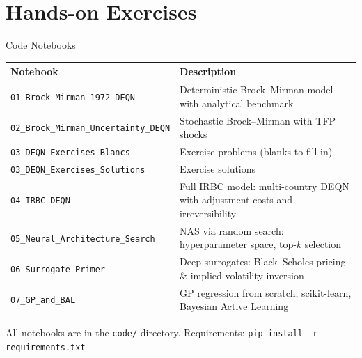 \documentclass[aspectratio=169,11pt]{beamer}
\begin{document}

\section{Hands-on Exercises}

\begin{frame}{Code Notebooks}
\begin{center}
\renewcommand{\arraystretch}{1.4}
{\small
\begin{tabular}{@{}lp{8cm}@{}}
\toprule
\textbf{Notebook} & \textbf{Description} \\
\midrule
\texttt{01\_Brock\_Mirman\_1972\_DEQN} & Deterministic Brock--Mirman model with analytical benchmark \\
\texttt{02\_Brock\_Mirman\_Uncertainty\_DEQN} & Stochastic Brock--Mirman with TFP shocks \\
\texttt{03\_DEQN\_Exercises\_Blancs} & Exercise problems (blanks to fill in) \\
\texttt{03\_DEQN\_Exercises\_Solutions} & Exercise solutions \\
\texttt{04\_IRBC\_DEQN} & Full IRBC model: multi-country DEQN with adjustment costs and irreversibility \\
\texttt{05\_Neural\_Architecture\_Search} & NAS via random search: hyperparameter space, top-$k$ selection \\
\texttt{06\_Surrogate\_Primer} & Deep surrogates: Black--Scholes pricing \& implied volatility inversion \\
\texttt{07\_GP\_and\_BAL} & GP regression from scratch, scikit-learn, Bayesian Active Learning \\
\bottomrule
\end{tabular}
}
\end{center}

\vspace{0.5em}
All notebooks are in the \texttt{code/} directory. Requirements: \texttt{pip install -r requirements.txt}
\end{frame}
\end{document}
